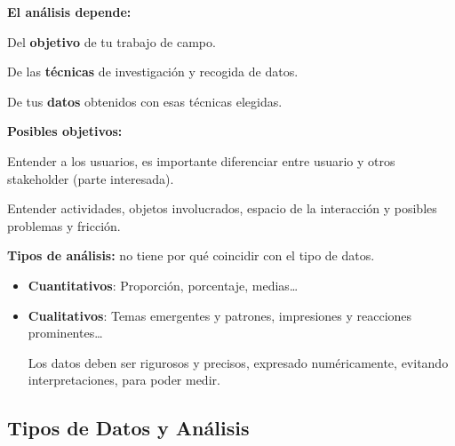 \textbf{El análisis depende:}

Del \textbf{objetivo} de tu trabajo de campo.

De las \textbf{técnicas} de investigación y recogida de datos.

De tus \textbf{datos} obtenidos con esas técnicas elegidas.

\textbf{Posibles objetivos:}

Entender a los usuarios, es importante diferenciar entre usuario y otros
stakeholder (parte interesada).

Entender actividades, objetos involucrados, espacio de la interacción y
posibles problemas y fricción.

\textbf{Tipos de análisis:} no tiene por qué coincidir con el tipo de
datos.

\begin{itemize}
\item
  \textbf{Cuantitativos}: Proporción, porcentaje, medias\ldots{}
\item
  \textbf{Cualitativos}: Temas emergentes y patrones, impresiones y
  reacciones prominentes\ldots{}

  Los datos deben ser rigurosos y precisos, expresado numéricamente,
  evitando interpretaciones, para poder medir.
\end{itemize}

\hypertarget{tipos-de-datos-y-anuxe1lisis}{%
\subsection{Tipos de Datos y
Análisis}\label{tipos-de-datos-y-anuxe1lisis}}

